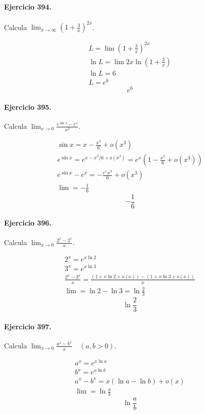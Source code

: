 \documentclass[11pt,a4paper]{article}
\begin{document}
\paragraph{Ejercicio 394.} Calcula $\displaystyle \lim_{x\to\infty}\left(1+\frac{3}{x}\right)^{2x}$.

\[
\begin{aligned}
L=\lim\left(1+\frac{3}{x}\right)^{2x}\\
\ln L=\lim 2x\ln\left(1+\frac{3}{x}\right)\\
\ln L=6\\
L=e^6
\end{aligned}
\]
\[\boxed{e^6}\]


\paragraph{Ejercicio 395.} Calcula $\displaystyle \lim_{x\to0}\frac{e^{\sin x}-e^x}{x^3}$.

\[
\begin{aligned}
\sin x=x-\frac{x^3}{6}+o(x^3)\\
e^{\sin x}=e^{x-x^3/6+o(x^3)}=e^x\left(1-\frac{x^3}{6}+o(x^3)\right)\\
e^{\sin x}-e^x=-\frac{e^xx^3}{6}+o(x^3)\\
\lim=-\frac16
\end{aligned}
\]
\[\boxed{-\frac16}\]


\paragraph{Ejercicio 396.} Calcula $\displaystyle \lim_{x\to0}\frac{2^x-3^x}{x}$.

\[
\begin{aligned}
2^x=e^{x\ln2}\\
3^x=e^{x\ln3}\\
\frac{2^x-3^x}{x}=\frac{(1+x\ln2+o(x))-(1+x\ln3+o(x))}{x}\\
\lim=\ln2-\ln3=\ln\frac23
\end{aligned}
\]
\[\boxed{\ln\frac23}\]


\paragraph{Ejercicio 397.} Calcula $\displaystyle \lim_{x\to0}\frac{a^x-b^x}{x}\quad(a,b>0)$.

\[
\begin{aligned}
a^x=e^{x\ln a}\\
b^x=e^{x\ln b}\\
a^x-b^x=x(\ln a-\ln b)+o(x)\\
\lim=\ln\frac{a}{b}
\end{aligned}
\]
\[\boxed{\ln\frac{a}{b}}\]
\end{document}
